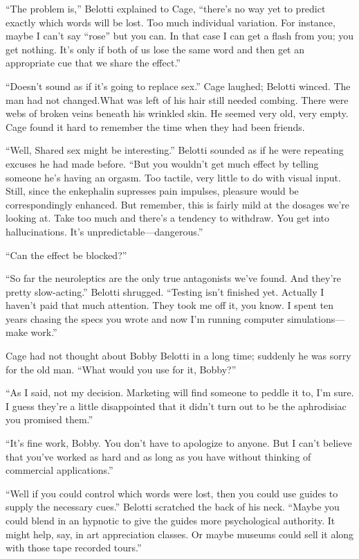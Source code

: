 “The problem is,” Belotti explained to Cage, “there’s no way yet to predict exactly which words will be lost. Too much individual variation. For instance, maybe I can’t say “rose” but you can. In that case I can get a flash from you; you get nothing. It’s only if both of us lose the same word and then get an appropriate cue that we share the effect.”

“Doesn’t sound as if it’s going to replace sex.” Cage laughed; Belotti winced. The man had not changed.What was left of his hair still needed combing. There were webs of broken veins beneath his wrinkled skin. He seemed very old, very empty. Cage found it hard to remember the time when they had been friends.

“Well, Shared sex might be interesting.” Belotti sounded as if he were repeating excuses he had made before. “But you wouldn’t get much effect by telling someone he’s having an orgasm. Too tactile, very little to do with visual input. Still, since the enkephalin supresses pain impulses, pleasure would be correspondingly enhanced. But remember, this is fairly mild at the dosages we’re looking at. Take too much and there’s a tendency to withdraw. You get into hallucinations. It’s unpredictable—dangerous.”

“Can the effect be blocked?”

“So far the neuroleptics are the only true antagonists we’ve found. And they’re pretty slow-acting.” Belotti shrugged. “Testing isn’t finished yet. Actually I haven’t paid that much attention. They took me off it, you know. I spent ten years chasing the specs you wrote and now I’m running computer simulations—make work.”

Cage had not thought about Bobby Belotti in a long time; suddenly he was sorry for the old man. “What would you use for it, Bobby?”

“As I said, not my decision. Marketing will find someone to peddle it to, I’m sure. I guess they’re a little disappointed that it didn’t turn out to be the aphrodisiac you promised them.”

“It’s fine work, Bobby. You don’t have to apologize to anyone. But I can’t believe that you’ve worked as hard and as long as you have without thinking of commercial applications.”

“Well if you could control which words were lost, then you could use guides to supply the necessary cues.” Belotti scratched the back of his neck. “Maybe you could blend in an hypnotic to give the guides more psychological authority. It might help, say, in art appreciation classes. Or maybe museums could sell it along with those tape recorded tours.”

